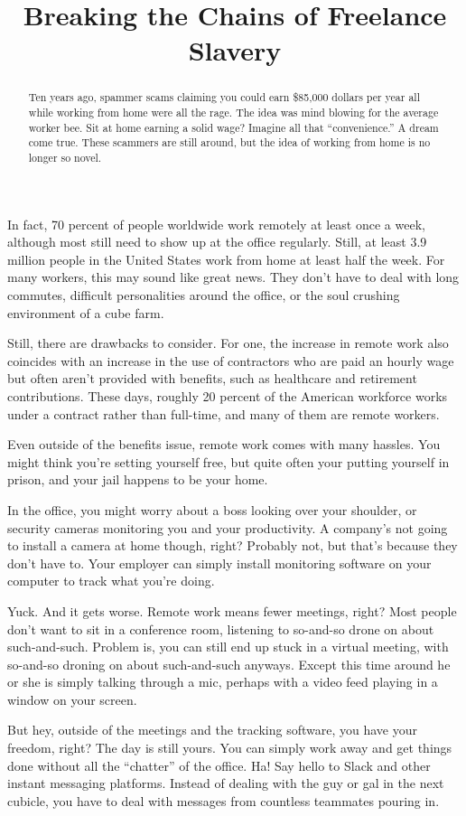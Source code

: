 \documentclass{main}
\title{Breaking the Chains of Freelance Slavery}
\begin{document}
\begin{abstract}
Ten years ago, spammer scams claiming you could earn \$85,000
dollars per year all while working from home were all the rage.
The idea was mind blowing for the average worker bee. Sit at home
earning a solid wage? Imagine all that ``convenience.'' A dream come true.
These scammers are still around, but the idea of working from home is no longer so novel.
\end{abstract}

In fact, 70 percent of people worldwide work remotely at least once a week,
although most still need to show up at the office regularly. Still, at least 3.9
million people in the United States work from home at least half the week. For
many workers, this may sound like great news. They don't have to deal with long
commutes,   difficult personalities around the office, or the soul crushing
environment of a cube farm.

Still, there are drawbacks to consider. For one, the increase in remote work
also coincides with an increase in the use of contractors who are paid an hourly
wage but often aren't provided with benefits, such as healthcare and retirement
contributions. These days, roughly 20 percent of the American workforce works
under a contract rather than full-time, and many of them are remote workers.

Even outside of the benefits issue, remote work comes with many hassles. You
might think you're setting yourself free, but quite often your putting yourself
in prison, and your jail happens to be your home.

In the office, you might worry about a boss looking over your shoulder, or
security cameras monitoring you and your productivity. A company's not going to
install a camera at home though, right? Probably not, but that's because they
don't have to. Your employer can simply install monitoring software on your
computer to track what you're doing.

Yuck. And it gets worse. Remote work means fewer meetings, right? Most people
don't want to sit in a conference room, listening to so-and-so drone on about
such-and-such. Problem is, you can still end up stuck in a virtual meeting, with
so-and-so droning on about such-and-such anyways. Except this time around he or
she is simply talking through a mic, perhaps with a video feed playing in a
window on your screen.

But hey, outside of the meetings and the tracking software, you have your
freedom, right? The day is still yours. You can simply work away and get things
done without all the ``chatter'' of the office. Ha! Say hello to Slack and other
instant messaging platforms. Instead of dealing with the guy or gal in the next
cubicle, you have to deal with messages from countless teammates pouring in.
\end{document}
